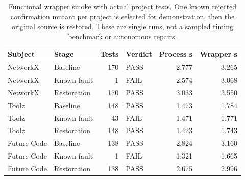 \begin{table}[t]
\centering\small
\caption{Functional wrapper smoke with actual project tests. One known rejected confirmation mutant per project is selected for demonstration, then the original source is restored. These are single runs, not a sampled timing benchmark or autonomous repairs.}\label{tab:wrapper}
\begin{tabular}{@{}llrlrr@{}}
\toprule
Subject & Stage & Tests & Verdict & Process s & Wrapper s\\
\midrule
NetworkX & Baseline & 170 & PASS & 2.777 & 3.265\\
NetworkX & Known fault & 1 & FAIL & 2.574 & 3.068\\
NetworkX & Restoration & 170 & PASS & 3.033 & 3.550\\
Toolz & Baseline & 148 & PASS & 1.473 & 1.784\\
Toolz & Known fault & 43 & FAIL & 1.471 & 1.771\\
Toolz & Restoration & 148 & PASS & 1.423 & 1.743\\
Future Code & Baseline & 138 & PASS & 2.824 & 3.160\\
Future Code & Known fault & 1 & FAIL & 1.321 & 1.665\\
Future Code & Restoration & 138 & PASS & 2.675 & 2.996\\
\bottomrule
\end{tabular}
\end{table}
